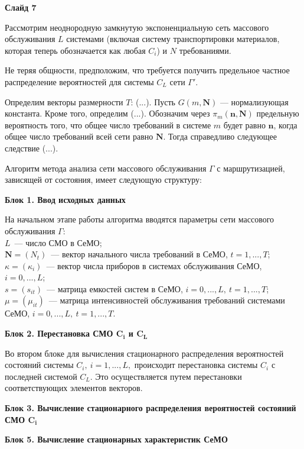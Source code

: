 \documentclass[a4paper,14pt]{extarticle}
\theoremstyle{note}
\begin{document}
\textbf{Слайд 7}

Рассмотрим неоднородную замкнутую экспоненциальную сеть массового обслуживания $L$ системами (включая систему транспортировки материалов, которая теперь обозначается как любая $C_i$) и $N$ требованиями.

Не теряя общности, предположим, что требуется получить предельное частное распределение вероятностей для системы $C_L$ сети $\Gamma'$.

Определим векторы размерности $T$: (...). Пусть $G(m,\mathbf{N})$ --- нормализующая константа. Кроме того, определим (...).
Обозначим через $\pi_m(\mathbf{n},\mathbf{N})$ предельную вероятность того, что общее число требований в системе $m$ будет равно $\mathbf{n}$, когда общее число требований всей сети равно $\mathbf{N}$. Тогда справедливо следующее следствие (...).


Алгоритм метода анализа сети массового обслуживания $\Gamma$ с маршрутизацией, зависящей от состояния, имеет следующую структуру:

\medskip
\textbf{Блок 1. Ввод исходных данных}

На начальном этапе работы алгоритма вводятся параметры сети массового обслуживания $\Gamma$:\\
$L$~--- число СМО в СеМО;\\
$\mathbf{N}=(N_t)$~--- вектор начального числа требований в СеМО, $t=1,...,T$;\\
$\kappa=(\kappa_i)$~--- вектор числа приборов в системах обслуживания СеМО, $i=0,...,L$;\\
$s=(s_{it})$~--- матрица емкостей систем в СеМО, $i=0,...,L,~t=1,...,T$;\\
$\mu=(\mu_{it})$~--- матрица интенсивностей обслуживания требований системами СеМО, $i=0,...,L,~t=1,...,T$.

\medskip
\textbf{Блок 2. Перестановка СМО $\boldsymbol{C_i}$ и $\boldsymbol{C_L}$}

Во втором блоке для вычисления стационарного распределения вероятностей состояний системы $C_i,~i=1,...,L,$ происходит перестановка системы $C_i$ с последней системой $C_L$. Это осуществляется путем перестановки соответствующих элементов векторов.

\medskip
\textbf{Блок 3. Вычисление стационарного распределения вероятностей состояний СМО $\boldsymbol{C_i}$}


\medskip
\textbf{Блок 5. Вычисление стационарных характеристик СеМО}
\end{document}

